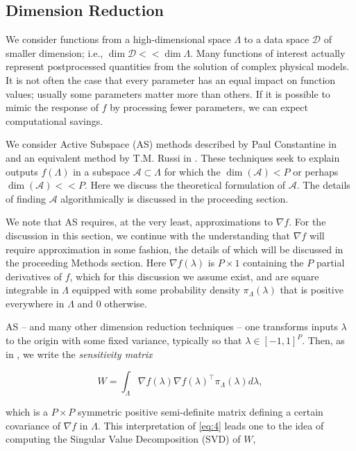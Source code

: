 \documentclass{amsart}
\newcommand{\D}{\mathcal{D}}
\newcommand{\A}{\mathcal{A}}
\begin{document}
\subsection{Dimension Reduction}
We consider functions from a high-dimensional space $\Lambda$ to a data space $\D$ of smaller dimension; i.e., $\dim \D << \dim \Lambda$. Many functions of interest
actually represent postprocessed quantities from the solution of complex physical models. 
It is not often the case that every parameter has an equal impact on function values; usually some parameters matter more than others. If it is possible to mimic the response of $f$ by processing fewer parameters, we can expect computational savings.

We consider Active Subspace (AS) methods described by Paul Constantine in \cite{Constantine2015} and an equivalent method by T.M. Russi in \cite{Russi}. These techniques seek to explain outputs $f(\Lambda)$ in a subspace $\A \subset \Lambda$ for which the $\dim (\A) <P$ or perhaps $\dim(\A)<<P$. Here we discuss the theoretical formulation of $\A$. The details of finding $\A$ algorithmically is discussed in the proceeding section.

We note that AS requires, at the very least, approximations to $\nabla f$. For the discussion in this section, we continue with the understanding that $\nabla f$ will require approximation in some fashion, the details of which will be discussed in the proceeding Methods section. Here $\nabla f(\lambda)$ is $P\times 1$ containing the $P$ partial derivatives of $f$, which for this discussion we assume exist, and are square integrable in $\Lambda$ equipped with some probability density $\pi_\Lambda(\lambda)$ that is positive everywhere in $\Lambda$ and 0 otherwise.
 
AS -- and many other dimension reduction techniques \cite{Russi} -- one transforms inputs $\lambda$ to the origin with some fixed variance, typically so that $\lambda\in [-1,1]^P$. Then, as in \cite{ConstantineMC}, we write the \textit{sensitivity matrix}

\begin{equation} \label{eq:4}
W=\int_\Lambda \nabla f(\lambda) \nabla f(\lambda)^\top  \pi_\Lambda(\lambda) d\lambda,
\end{equation} 

\noindent which is a $P\times P$ symmetric positive semi-definite matrix defining a certain covariance of $\nabla f$ in $\Lambda$. This interpretation of \eqref{eq:4} leads one to the idea of computing the Singular Value Decomposition (SVD) of $W$,
\end{document}

